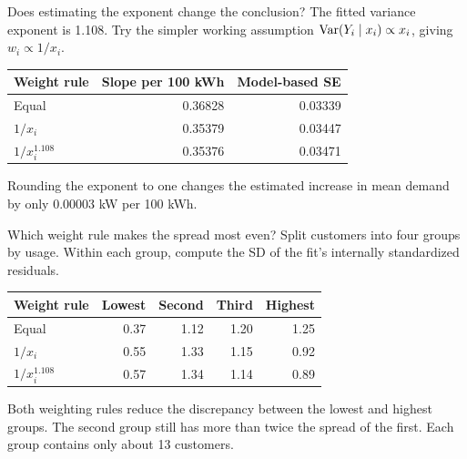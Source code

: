 \begin{frame}{Does estimating the exponent change the conclusion?}
    The fitted variance exponent is 1.108. Try the simpler working assumption $\operatorname{Var}(Y_i\mid x_i)\propto x_i$, giving $w_i\propto1/x_i$.
    \begin{center}
        \begin{tabular}{lrr}
            \toprule Weight rule & Slope per 100 kWh & Model-based SE \\ \midrule
            Equal & 0.36828 & 0.03339 \\
            $1/x_i$ & 0.35379 & 0.03447 \\
            $1/x_i^{1.108}$ & 0.35376 & 0.03471 \\ \bottomrule
        \end{tabular}
    \end{center}
    Rounding the exponent to one changes the estimated increase in mean demand by only 0.00003 kW per 100 kWh.
\end{frame}

\begin{frame}{Which weight rule makes the spread most even?}
    Split customers into four groups by usage. Within each group, compute the SD of the fit's internally standardized residuals.
    \begin{center}
        \begin{tabular}{lrrrr}
            \toprule Weight rule & Lowest & Second & Third & Highest \\ \midrule
            Equal & 0.37 & 1.12 & 1.20 & 1.25 \\
            $1/x_i$ & 0.55 & 1.33 & 1.15 & 0.92 \\
            $1/x_i^{1.108}$ & 0.57 & 1.34 & 1.14 & 0.89 \\ \bottomrule
        \end{tabular}
    \end{center}
    Both weighting rules reduce the discrepancy between the lowest and highest groups. The second group still has more than twice the spread of the first. Each group contains only about 13 customers.
\end{frame}

